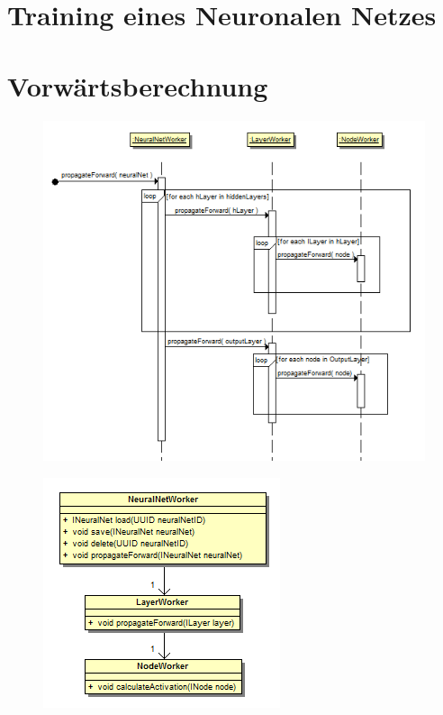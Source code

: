 \section{Training eines Neuronalen Netzes}

\section{Vorwärtsberechnung}

\begin{figure}[h]
\begin{center}
\includegraphics{Abbildungen/UML/uml_ronny/propagateForward.png}
\end{center}
\end{figure}

\begin{figure}[h]
\begin{center}
\includegraphics{Abbildungen/UML/uml_ronny/workerclass.png}
\end{center}
\end{figure}
